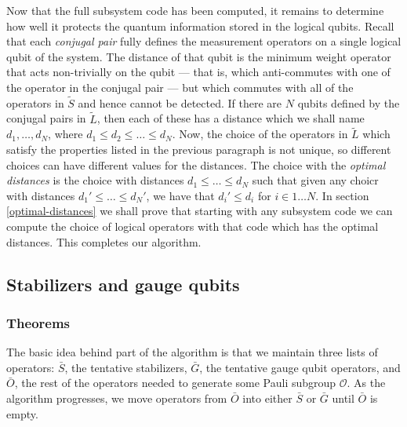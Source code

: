 \documentclass[twocolumn,showpacs,preprintnumbers,amsmath,amssymb,nofootinbib,pra,floatfix]{revtex4}
\begin{document}
Now that the full subsystem code has been computed, it remains to determine how well it protects the quantum information stored in the logical qubits.  Recall that each \emph{conjugal pair} fully defines the measurement operators on a single logical qubit of the system.  The distance of that qubit is the minimum weight operator that acts non-trivially on the qubit --- that is, which anti-commutes with one of the operator in the conjugal pair --- but which commutes with all of the operators in $\tilde S$ and hence cannot be detected.  If there are $N$ qubits defined by the conjugal pairs in $\tilde L$, then each of these has a distance which we shall name $d_1,\dots,d_N$, where $d_1\le d_2 \le \dots \le d_N$.  Now, the choice of the operators in $\tilde L$ which satisfy the properties listed in the previous paragraph is not unique, so different choices can have different values for the distances.  The choice with the \emph{optimal distances} is the choice with distances $d_1\le \dots \le d_N$ such that given any choicr with distances $d_1'\le \dots \le d_N'$, we have that $d_i' \le d_i$ for $i\in 1\dots N$.  In section \ref{optimal-distances} we shall prove that starting with any subsystem code we can compute the choice of logical operators with that code which has the optimal distances.  This completes our algorithm.
\subsection{Stabilizers and gauge qubits}

\label{stabilizers-and-gauge-qubits}

\subsubsection{Theorems}

The basic idea behind part of the algorithm is that we maintain three lists of operators: $\bar S$, the tentative stabilizers, $\bar G$, the tentative gauge qubit operators, and $\bar O$, the rest of the operators needed to generate some Pauli subgroup $\mathcal{O}$.  As the algorithm progresses, we move operators from $\bar O$ into either $\bar S$ or $\bar G$ until $\bar O$ is empty.
\end{document}
